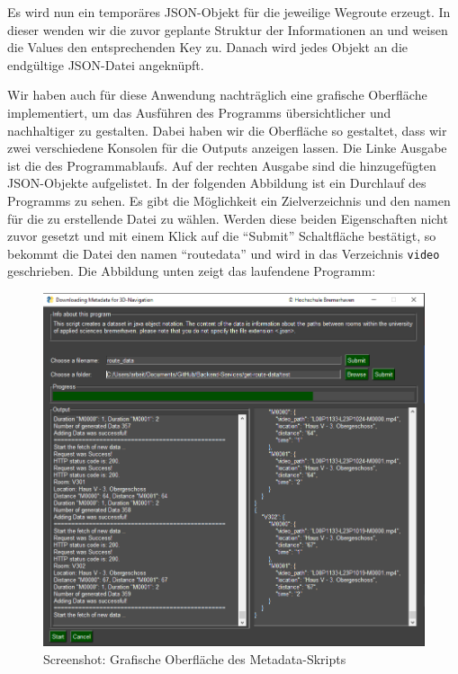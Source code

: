 Es wird nun ein temporäres JSON-Objekt für die jeweilige Wegroute erzeugt. In dieser wenden wir die zuvor geplante Struktur der Informationen an und weisen die Values den entsprechenden Key zu. Danach wird jedes Objekt an die endgültige JSON-Datei angeknüpft.

Wir haben auch für diese Anwendung nachträglich eine grafische Oberfläche implementiert, um das Ausführen des Programms übersichtlicher und nachhaltiger zu gestalten. Dabei haben wir die Oberfläche so gestaltet, dass wir zwei verschiedene Konsolen für die Outputs anzeigen lassen. Die Linke Ausgabe ist die des Programmablaufs. Auf der rechten Ausgabe sind die hinzugefügten JSON-Objekte aufgelistet. In der folgenden Abbildung ist ein Durchlauf des Programms zu sehen. Es gibt die Möglichkeit ein Zielverzeichnis und den namen für die zu erstellende Datei zu wählen. Werden diese beiden Eigenschaften nicht zuvor gesetzt und mit einem Klick auf die ``Submit'' Schaltfläche bestätigt, so bekommt die Datei den namen ``routedata'' und wird in das Verzeichnis \verb|video| geschrieben. Die Abbildung unten zeigt das laufendene Programm:\vspace{-1.5mm}

\begin{figure}[H]
    \includegraphics[width=\textwidth]{Figures/3DNavigator/create_metadata_pic_Fertig.png}
    \caption{Screenshot: Grafische Oberfläche des Metadata-Skripts}
    \label{fig:integration}
    \centering
\end{figure}\vspace{-2.5mm}

